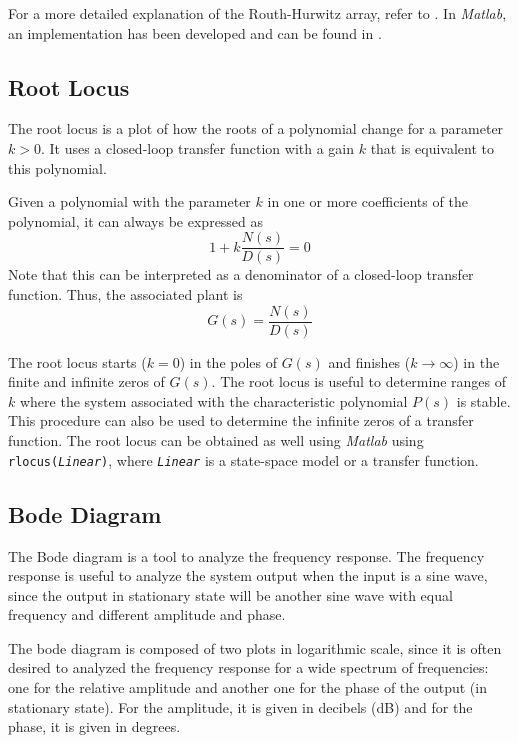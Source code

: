 For a more detailed explanation of the Routh-Hurwitz array, refer to \cite[pp. 212-214]{ogata2010modern}. In \textit{Matlab}, an implementation has been developed and can be found in \cite{RHCaliche}.

\subsection{Root Locus}\label{sec:root_locus}
The root locus is a plot of how the roots of a polynomial change for a parameter $k>0$. It uses a closed-loop transfer function with a gain $k$ that is equivalent to this polynomial.

Given a polynomial with the parameter $k$ in one or more coefficients of the polynomial, it can always be expressed as 
\begin{equation}
    1+k\dfrac{N(s)}{D(s)}=0
\end{equation}
Note that this can be interpreted as a denominator of a closed-loop transfer function. Thus, the associated plant is 
\begin{equation}
    G(s)=\dfrac{N(s)}{D(s)}
\end{equation}

The root locus starts ($k=0$) in the poles of $G(s)$ and finishes ($k\rightarrow\infty$) in the finite and infinite zeros of $G(s)$. The root locus is useful to determine ranges of $k$ where the system associated with the characteristic polynomial $P(s)$ is stable. This procedure can also be used to determine the infinite zeros of a transfer function. The root locus can be obtained as well using \textit{Matlab} using \texttt{rlocus(\textit{Linear})}, where \texttt{\textit{Linear}} is a state-space model or a transfer function.

\subsection{Bode Diagram}\label{sec:bode}
The Bode diagram is a tool to analyze the frequency response. The frequency response is useful to analyze the system output when the input is a sine wave, since the output in stationary state will be another sine wave with equal frequency and different amplitude and phase.

The bode diagram is composed of two plots in logarithmic scale, since it is often desired to analyzed the frequency response for a wide spectrum of frequencies: one for the relative amplitude and another one for the phase of the output (in stationary state). For the amplitude, it is given in decibels (dB) and for the phase, it is given in degrees.


